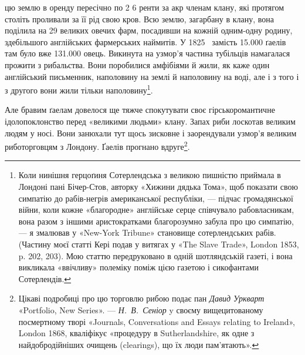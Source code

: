 цю землю в оренду пересічно по 2 6 ренти за акр
членам клану, які протягом століть проливали за її рід свою кров.
Всю землю, загарбану в клану, вона поділила на 29 великих
овечих фарм, посадивши на кожній одним-одну родину, здебільшого
англійських фармерських наймитів. У 1825~ замість
\num{15.000} ґаелів там було вже \num{131.000} овець. Викинута на узмор’я
частина тубільців намагалася прожити з рибальства. Вони поробилися
амфібіями й жили, як каже один англійський письменник,
наполовину на землі й наполовину на воді, але і з того
і з другого вони жили тільки наполовину\footnote{
Коли нинішня герцоґиня Сотерлендська з великою пишністю
приймала в Лондоні пані Бічер-Стов, авторку «Хижини дядька Тома»,
щоб показати свою симпатію до рабів-негрів американської республіки, —
підчас громадянської війни, коли кожне «благородне» англійське серце
співчувало рабовласникам, вона разом з іншими аристократками благорозумно
забула про цю симпатію, — я змалював у «New-York Tribune»
становище сотерлендських рабів. (Частину моєї статті Кері подав у витягах
у «The Slave Trade», London 1853, p. 202, 203). Мою статтю передруковано
в одній шотляндській газеті, і вона викликала «ввічливу» полеміку
поміж цією газетою і сикофантами Сотерлендів.
}.

Але бравим ґаелам довелося ще тяжче спокутувати своє гірсько\dash{}романтичне
ідолопоклонство перед «великими людьми»
клану. Запах риби лоскотав великим людям у носі. Вони занюхали
тут щось зисковне і заорендували узмор’я великим риботорговцям
з Лондону. Ґаелів прогнано вдруге\footnote{
Цікаві подробиці про цю торговлю рибою подає пан \emph{Давид Уркварт}
«Portfolio, New Series». — \emph{Н.~В.~Сеніор} y своєму вищецитованому посмертному
творі «Journals, Conversations and Essays relating to Ireland»,
London 1868, кваліфікує «процедуру в Sutherlandshire, як одне з найдобродійніших
очищень (clearings), що їх люди пам’ятають».
}.

